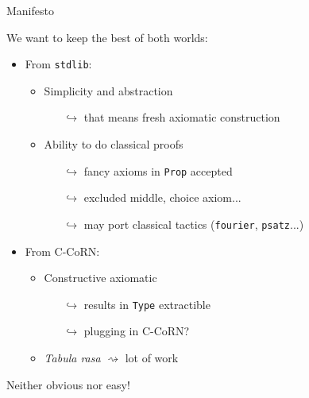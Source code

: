 \documentclass{beamer}
\begin{document}
\begin{frame}{Manifesto}

We want to keep the best of both worlds:

\begin{itemize}
  \item From \texttt{stdlib}:
  \begin{itemize}
    \item Simplicity and abstraction
    \begin{itemize}
      \item[$\hookrightarrow$] that means fresh axiomatic construction
    \end{itemize}
    \item Ability to do classical proofs
    \begin{itemize}
      \item[$\hookrightarrow$] fancy axioms in \texttt{Prop} accepted
      \item[$\hookrightarrow$] excluded middle, choice axiom...
      \item[$\hookrightarrow$] may port classical tactics (\texttt{fourier}, \texttt{psatz}...)
    \end{itemize}
  \end{itemize}\pause
  \item From C-CoRN:
  \begin{itemize}
    \item Constructive axiomatic
    \begin{itemize}
      \item[$\hookrightarrow$] results in \texttt{Type} extractible
      \item[$\hookrightarrow$] plugging in C-CoRN?
    \end{itemize}
    \item \emph{Tabula rasa} $\rightsquigarrow$ lot of work
  \end{itemize}
\end{itemize}\pause

Neither obvious nor easy!

\end{frame}
\end{document}
